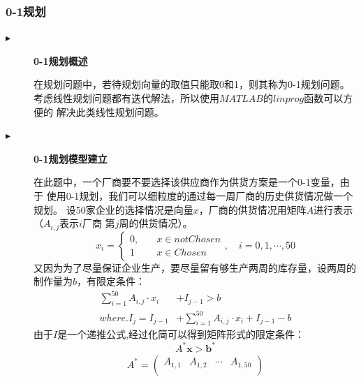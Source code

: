 \documentclass{cumcmthesis}
\begin{document}
\subsubsection*{0-1规划}
\begin{description}
    \item[$\blacktriangleright$] \textbf{0-1规划概述}\par
        在规划问题中，若待规划向量的取值只能取0和1，则其称为0-1规划问题。
        考虑线性规划问题都有迭代解法，所以使用$MATLAB$的$linprog$函数可以方便的
        解决此类线性规划问题。
    \item[$\blacktriangleright$] \textbf{0-1规划模型建立}\par
        在此题中，一个厂商要不要选择该供应商作为供货方案是一个0-1变量，由于
        使用0-1规划，我们可以细粒度的通过每一周厂商的历史供货情况做一个规划。
        设50家企业的选择情况是向量$x$，厂商的供货情况用矩阵$A$进行表示（$A_{i,j}$表示$i$厂商
        第$j$周的供货情况）。
        \begin{equation}
            x_i = \left\{
            \begin{aligned}
                0,\quad & x \in notChosen \\
                1 \quad & x \in Chosen
            \end{aligned}
            \right.,\quad i=0,1,\cdots,50 \nonumber
        \end{equation}
        又因为为了尽量保证企业生产，要尽量留有够生产两周的库存量，设两周的制作量为$b$，有限定条件：
        \begin{equation}
            \begin{aligned}
                \sum_{i=1}^{50} A_{i,j} \cdot x_i & + I_{j-1}  > b                                             \\
                where. I_{j}  = I_{j-1}           & + \sum_{i=1}^{50} A_{i,j} \cdot x_i + I_{j-1} -b \nonumber
            \end{aligned}
        \end{equation}
        由于$I$是一个递推公式,经过化简可以得到矩阵形式的限定条件：
        \begin{equation}
            A^{*} \bm{x} > \bm{b^{*}} \nonumber
        \end{equation}
        {\small
        \begin{equation}
            \begin{aligned}
                A^* =
                \begin{pmatrix}
                    A_{1,1}                                & A_{1,2}                                & \cdots & A_{1,50}                                  \\

\end{pmatrix}
\end{aligned}
\end{equation}}
\end{description}
\end{document}
